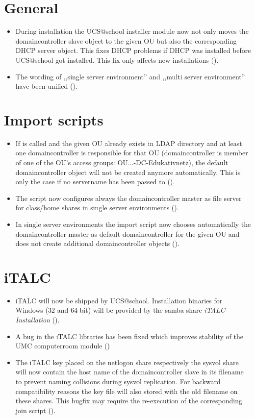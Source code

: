 \section{General}
\begin{itemize}
\item During installation the UCS@school installer module now not only moves the domaincontroller slave object
  to the given OU but also the corresponding DHCP server object. This fixes DHCP problems if DHCP was
  installed before UCS@school got installed. This fix only affects new installations ().
\item The wording of ,,single server environment'' and ,,multi server environment'' have been unified ().
\end{itemize}

\section{Import scripts}
\begin{itemize}
\item If  is called and the given OU already exists in LDAP directory and at least one
  domaincontroller is responsible for that OU (domaincontroller is member of one of the OU's access groups:
  OU...-DC-Edukativnetz), the default domaincontroller object will not be created anymore automatically. This
  is only the case if no servername has been passed to  ().
\item The script  now configures always the domaincontroller master as file server for
      class/home shares in single server environments ().
\item In single server environments the import script  now chooses automatically the
      domaincontroller master as default domaincontroller for the given OU and does not create additional
      domaincontroller objects ().
\end{itemize}
 
\section{iTALC}
\begin{itemize}
\item iTALC will now be shipped by UCS@school. Installation binaries for Windows (32 and 64 bit) will be
  provided by the samba share \emph{iTALC-Installation} ().
\item A bug in the iTALC libraries has been fixed which improves stability of the UMC computerroom module ()
\item The iTALC key placed on the netlogon share respectively the sysvol share will now contain the host name
      of the domaincontroller slave in its filename to prevent naming collisions during sysvol replication. 
      For backward compatibility reasons the key file will also stored with the old filename on these shares. This
      bugfix may require the re-execution of the corresponding join script ().
\end{itemize}

